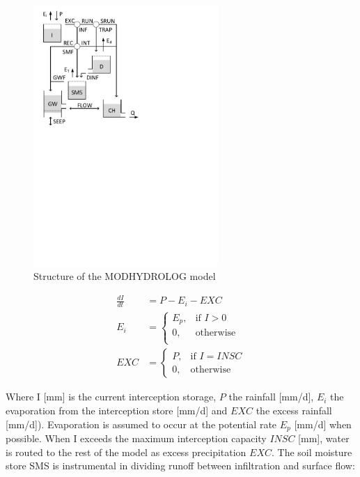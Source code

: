 { 																	%
\begin{figure}
\includegraphics[trim=1cm 16.5cm 9cm 1cm,width=7cm,keepaspectratio]{./AppA_files/36_schematic.pdf}
\caption{Structure of the MODHYDROLOG model} \label{fig:36_schematic}
\end{figure}

\begin{align}
	\frac{dI}{dt} &= P-E_i-EXC \\
	E_i &= \begin{cases}
		E_p, &\text{if } I > 0 \\
		0, & \text{otherwise} \\
	\end{cases} \\
	EXC &= 
	\begin{cases}
		P, & \text{if } I = INSC \\
		0, & \text{otherwise}
	\end{cases}
\end{align}

Where I [mm] is the current interception storage, $P$ the rainfall [mm/d], $E_i$ the evaporation from the interception store [mm/d] and $EXC$ the excess rainfall [mm/d]). Evaporation is assumed to occur at the potential rate $E_p$ [mm/d] when possible. When I exceeds the maximum interception capacity $INSC$ [mm], water is routed to the rest of the model as excess precipitation $EXC$. The soil moisture store SMS is instrumental in dividing runoff between infiltration and surface flow:

} %

